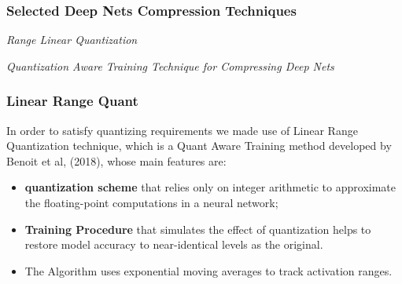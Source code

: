 



\begin{frame}
    \frametitle{Selected Deep Nets Compression Techniques}
        \begin{center}
            {\fontsize{40}{50}\selectfont \emph{Range Linear Quantization}}
        \end{center}
        \begin{center}
            \emph{Quantization Aware Training Technique for Compressing Deep Nets}
        \end{center}
\end{frame}


\begin{frame}
    \frametitle{Linear Range Quant}
        In order to satisfy quantizing requirements we made use of Linear Range Quantization technique, which is a Quant Aware Training method developed by
        Benoit et al, (2018), whose main features are:

        \begin{itemize}
            \item \textbf{quantization scheme} that relies only on integer arithmetic to approximate the floating-point computations in a neural network;
            \item \textbf{Training Procedure} that simulates the effect of quantization helps to restore model accuracy to near-identical
                levels as the original.
            \item The Algorithm uses exponential moving averages to track activation ranges.
        \end{itemize}
\end{frame}


